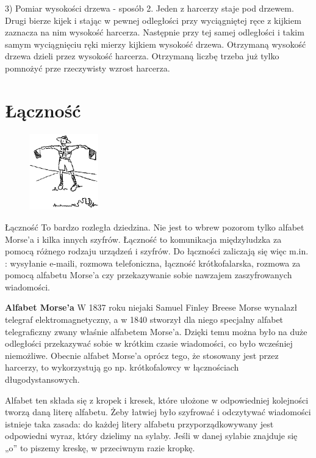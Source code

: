 3) Pomiar wysokości drzewa - sposób 2. Jeden z harcerzy staje pod drzewem. 
Drugi bierze kijek i stając w pewnej odległości przy wyciągniętej ręce z kijkiem zaznacza na nim wysokość harcerza. 
Następnie przy tej samej odległości i takim samym wyciągnięciu ręki mierzy kijkiem wysokość drzewa. 
Otrzymaną wysokość drzewa dzieli przez wysokość harcerza. 
Otrzymaną liczbę trzeba już tylko pomnożyć prze rzeczywisty wzrost harcerza.

\section{Łączność}
\begin{figure}
  \begin{center}
    \includegraphics[width=3cm]{grafiki/lacznik.png}
  \end{center}
\end{figure} Łączność To bardzo rozległa dziedzina. 
Nie jest to wbrew pozorom tylko alfabet Morse’a i kilka innych szyfrów. 
Łączność to komunikacja międzyludzka za pomocą różnego rodzaju urządzeń i szyfrów. 
Do łączności zaliczają się więc m.in. : wysyłanie e-maili, rozmowa telefoniczna, łączność krótkofalarska, rozmowa za pomocą alfabetu Morse’a czy przekazywanie sobie nawzajem zaszyfrowanych wiadomości. 
	
\textbf{Alfabet Morse’a}
W 1837 roku niejaki Samuel Finley Breese Morse wynalazł telegraf elektromagnetyczny, a w 1840 stworzył dla niego specjalny alfabet telegraficzny zwany właśnie alfabetem Morse’a. 
Dzięki temu można było na duże odległości przekazywać sobie w krótkim czasie wiadomości, co było wcześniej niemożliwe. 
Obecnie alfabet Morse’a oprócz tego, że stosowany jest przez harcerzy, to wykorzystują go np. krótkofalowcy w łącznościach długodystansowych.

Alfabet ten składa się z kropek i kresek, które ułożone w odpowiedniej kolejności tworzą daną literę alfabetu. 
Żeby łatwiej było szyfrować i odczytywać wiadomości istnieje taka zasada: do każdej litery alfabetu przyporządkowywany jest odpowiedni wyraz, który dzielimy na sylaby. 
Jeśli w danej sylabie znajduje się „o” to piszemy kreskę, w przeciwnym razie kropkę.


